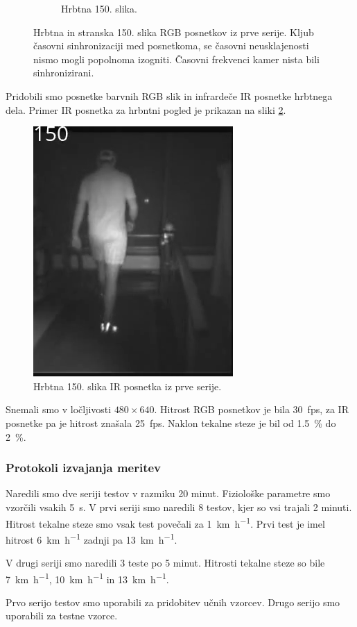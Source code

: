\begin{figure}[htb]
\begin{subfigure}{0.45\columnwidth}
		\caption{Hrbtna 150. slika.}
	\end{subfigure}
	\caption[Hrbtna in stranska 150. slika RGB posnetkov iz prve serije]{Hrbtna in stranska 150. slika RGB posnetkov iz prve serije. Kljub časovni sinhronizaciji med posnetkoma, se časovni neusklajenosti nismo mogli popolnoma izogniti. Časovni frekvenci kamer nista bili sinhronizirani.}
	\label{fig:primer-posnetka-rgb}
\end{figure}

Pridobili smo posnetke barvnih RGB slik in infrardeče IR posnetke hrbtnega dela. Primer IR posnetka za hrbntni pogled je prikazan na sliki \ref{fig:primer-posnetka-ir}.


\begin{figure}[htb]
	\centering
	\includegraphics[width=0.25\columnwidth]{./Slike/normal-ir-150.png}
	\caption{Hrbtna 150. slika IR posnetka iz prve serije.}
	\label{fig:primer-posnetka-ir}
\end{figure}

Snemali smo v ločljivosti $480 \times 640$. Hitrost RGB posnetkov je bila \SI{30}{fps}, za IR posnetke pa je hitrost znašala \SI{25}{fps}.  Naklon tekalne steze je bil od \SI{1.5}{\%} do \SI{2}{\%}.



\subsubsection{Protokoli izvajanja meritev}
Naredili smo dve seriji testov v razmiku 20 minut. Fiziološke parametre smo vzorčili vsakih \SI{5}{\s}. V prvi seriji smo naredili 8 testov, kjer so vsi trajali 2 minuti. Hitrost tekalne steze smo vsak test povečali za \SI{1}{\km\per\hour}. Prvi test je imel hitrost  \SI{6}{\km\per\hour} zadnji pa \SI{13}{\km\per\hour}.

V drugi seriji smo naredili 3 teste po 5 minut. Hitrosti tekalne steze so bile  \SI{7}{\km\per\hour}, \SI{10}{\km\per\hour} in \SI{13}{\km\per\hour}.

Prvo serijo testov smo uporabili za pridobitev učnih vzorcev. Drugo serijo smo uporabili za testne vzorce.


